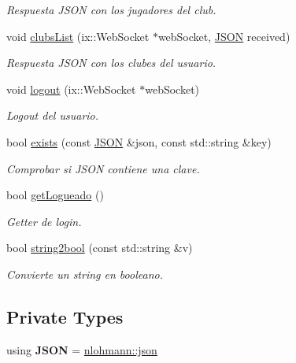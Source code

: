 \begin{DoxyCompactItemize}
\begin{DoxyCompactList}\small\item\em Respuesta J\+S\+ON con los jugadores del club. \end{DoxyCompactList}\item 
void \mbox{\hyperlink{classapp_aacb1fe686708ce187073676232491baf}{clubs\+List}} (ix\+::\+Web\+Socket $\ast$web\+Socket, \mbox{\hyperlink{classnlohmann_1_1basic__json}{J\+S\+ON}} received)
\begin{DoxyCompactList}\small\item\em Respuesta J\+S\+ON con los clubes del usuario. \end{DoxyCompactList}\item 
void \mbox{\hyperlink{classapp_a93176ba428640e16ea767d95319ce0c2}{logout}} (ix\+::\+Web\+Socket $\ast$web\+Socket)
\begin{DoxyCompactList}\small\item\em Logout del usuario. \end{DoxyCompactList}\item 
bool \mbox{\hyperlink{classapp_a42e2a44d3325daf63b3ec57b8921d1b5}{exists}} (const \mbox{\hyperlink{classnlohmann_1_1basic__json}{J\+S\+ON}} \&json, const std\+::string \&key)
\begin{DoxyCompactList}\small\item\em Comprobar si J\+S\+ON contiene una clave. \end{DoxyCompactList}\item 
bool \mbox{\hyperlink{classapp_a9d5d32bf19b4ae0a9c9d7fab8d87ac0f}{get\+Logueado}} ()
\begin{DoxyCompactList}\small\item\em Getter de login. \end{DoxyCompactList}\item 
bool \mbox{\hyperlink{classapp_af87506f90057b288a801f2a0d4c00ef4}{string2bool}} (const std\+::string \&v)
\begin{DoxyCompactList}\small\item\em Convierte un string en booleano. \end{DoxyCompactList}\end{DoxyCompactItemize}
\subsection*{Private Types}
\begin{DoxyCompactItemize}
\item 
\mbox{\label{classapp_a28638f5d121e9e12247d69575bda5e6d}} 
using {\bfseries J\+S\+ON} = \mbox{\hyperlink{namespacenlohmann_a2bfd99e845a2e5cd90aeaf1b1431f474}{nlohmann\+::json}}
\end{DoxyCompactItemize}
